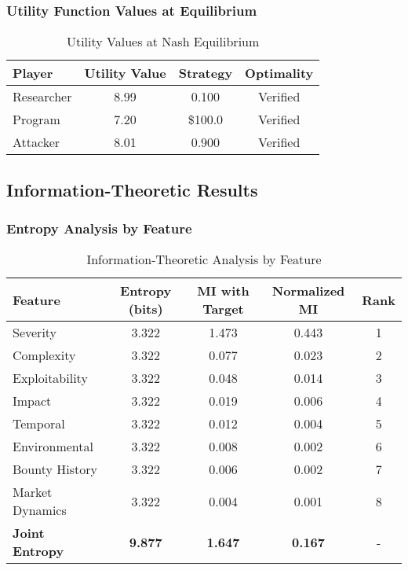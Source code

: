 \documentclass[journal]{IEEEtran}
\begin{document}
\subsubsection{Utility Function Values at Equilibrium}

\begin{table}[htbp]
\centering
\caption{Utility Values at Nash Equilibrium}
\begin{tabular}{lccc}
\toprule
\textbf{Player} & \textbf{Utility Value} & \textbf{Strategy} & \textbf{Optimality} \\
\midrule
Researcher & 8.99 & 0.100 & Verified \\
Program & 7.20 & \$100.0 & Verified \\
Attacker & 8.01 & 0.900 & Verified \\
\bottomrule
\end{tabular}
\end{table}

\subsection{Information-Theoretic Results}

\subsubsection{Entropy Analysis by Feature}

\begin{table}[htbp]
\centering
\caption{Information-Theoretic Analysis by Feature}
\begin{tabular}{lcccc}
\toprule
\textbf{Feature} & \textbf{Entropy (bits)} & \textbf{MI with Target} & \textbf{Normalized MI} & \textbf{Rank} \\
\midrule
Severity & 3.322 & 1.473 & 0.443 & 1 \\
Complexity & 3.322 & 0.077 & 0.023 & 2 \\
Exploitability & 3.322 & 0.048 & 0.014 & 3 \\
Impact & 3.322 & 0.019 & 0.006 & 4 \\
Temporal & 3.322 & 0.012 & 0.004 & 5 \\
Environmental & 3.322 & 0.008 & 0.002 & 6 \\
Bounty History & 3.322 & 0.006 & 0.002 & 7 \\
Market Dynamics & 3.322 & 0.004 & 0.001 & 8 \\
\midrule
\textbf{Joint Entropy} & \textbf{9.877} & \textbf{1.647} & \textbf{0.167} & - \\
\bottomrule
\end{tabular}
\end{table}
\end{document}
